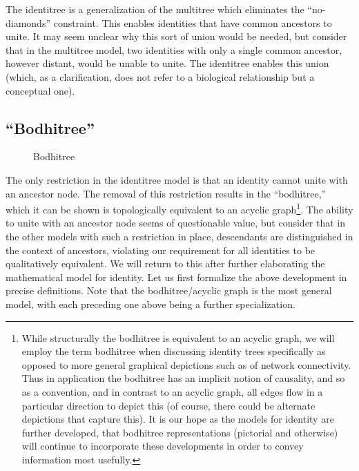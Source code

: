 \documentclass[pra,twocolumn,groupedaddress,10pt]{revtex4}
\theoremstyle{definition}
\begin{document}
The identitree is a generalization of the multitree which eliminates the ``no-diamonds'' constraint. This enables identities that have common ancestors to unite. It may seem unclear why this sort of union would be needed, but consider that in the multitree model, two identities with only a single common ancestor, however distant, would be unable to unite. The identitree enables this union (which, as a clarification, does not refer to a biological relationship but a conceptual one).

\subsection{``Bodhitree''} \label{sec:bodhitree}

\begin{figure}[htp]
\centering
{}
\caption{\label{fig:bodhitree}Bodhitree}
\end{figure}

The only restriction in the identitree model is that an identity cannot unite with an ancestor node. The removal of this restriction results in the ``bodhitree,'' which it can be shown is topologically equivalent to an acyclic graph\footnote{While structurally the bodhitree is equivalent to an acyclic graph, we will employ the term bodhitree when discussing identity trees specifically as opposed to more general graphical depictions such as of network connectivity. Thus in application the bodhitree has an implicit notion of causality, and so as a convention, and in contrast to an acyclic graph, all edges flow in a particular direction to depict this (of course, there could be alternate depictions that capture this). It is our hope as the models for identity are further developed, that bodhitree representations (pictorial and otherwise) will continue to incorporate these developments in order to convey information most usefully.}. The ability to unite with an ancestor node seems of questionable value, but consider that in the other models with such a restriction in place, descendants are distinguished in the context of ancestors, violating our requirement for all identities to be qualitatively equivalent. We will return to this after further elaborating the mathematical model for identity. Let us first formalize the above development in precise definitions. Note that the bodhitree/acyclic graph is the most general model, with each preceding one above being a further specialization.
\end{document}
